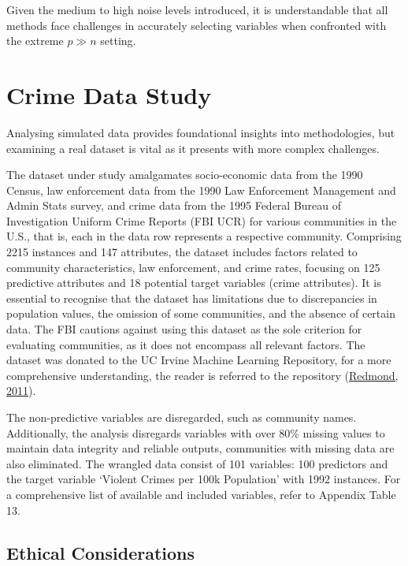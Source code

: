 \documentclass[
  11pt,
]{article}
\begin{document}
Given the medium to high noise levels introduced, it is understandable
that all methods face challenges in accurately selecting variables when
confronted with the extreme \(p \gg n\) setting.

\newpage

\section{Crime Data Study}

Analysing simulated data provides foundational insights into
methodologies, but examining a real dataset is vital as it presents with
more complex challenges.

The dataset under study amalgamates socio-economic data from the 1990
Census, law enforcement data from the 1990 Law Enforcement Management
and Admin Stats survey, and crime data from the 1995 Federal Bureau of
Investigation Uniform Crime Reports (FBI UCR) for various communities in
the U.S., that is, each in the data row represents a respective
community. Comprising 2215 instances and 147 attributes, the dataset
includes factors related to community characteristics, law enforcement,
and crime rates, focusing on 125 predictive attributes and 18 potential
target variables (crime attributes). It is essential to recognise that
the dataset has limitations due to discrepancies in population values,
the omission of some communities, and the absence of certain data. The
FBI cautions against using this dataset as the sole criterion for
evaluating communities, as it does not encompass all relevant factors.
The dataset was donated to the UC Irvine Machine Learning Repository,
for a more comprehensive understanding, the reader is referred to the
repository
(\protect\hyperlink{ref-misc_communities_and_crime_unnormalized_211}{Redmond,
2011}).

The non-predictive variables are disregarded, such as community names.
Additionally, the analysis disregards variables with over 80\% missing
values to maintain data integrity and reliable outputs, communities with
missing data are also eliminated. The wrangled data consist of 101
variables: 100 predictors and the target variable `Violent Crimes per
100k Population' with 1992 instances. For a comprehensive list of
available and included variables, refer to Appendix Table 13.

\subsection{Ethical Considerations}
\end{document}
